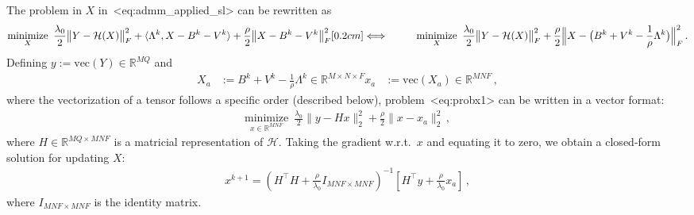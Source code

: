 \documentclass[a4paper,11pt]{article}
\def\\{}%
\def\eqref#1{<#1>}%
\newcommand{\mypar}[1]{\bigskip\noindent {\bf #1.}}
\begin{document}
\mypar{Updating $\bm{X}$}
The problem in $X$ in~\eqref{eq:admm_applied_sl} can be rewritten as
\begin{align}
  &
  \underset{X}{\text{minimize}}\,\,\,
  \frac{\lambda_0}{2}
  \big\|Y - \mathcal{H}(X)\big\|_F^2
  +
  \langle\Lambda^k, X - B^{k} - V^{k}\rangle
  +
  \frac{\rho}{2}
  \big\|X - B^k - V^k\big\|_{F}^2
  \notag
  \\[0.2cm]
  \Longleftrightarrow\qquad &
  \underset{X}{\text{minimize}}\,\,\,
  \frac{\lambda_0}{2}
  \big\|Y - \mathcal{H}(X) \big\|_F^2
  +
  \frac{\rho}{2}
  \Big\| X - \big(B^k + V^k - \frac{1}{\rho}\Lambda^k\big) \Big\|_F^2\,.
  \label{eq:probx1}
\end{align}
Defining $y := \text{vec}(Y) \in \mathbb{R}^{MQ}$ and
\begin{align*}
  X_a &:= B^k + V^k - \frac{1}{\rho}\Lambda^k \in \mathbb{R}^{M \times N \times F}
  \\
  x_a &:= \text{vec}(X_a) \in \mathbb{R}^{MNF}\,,
\end{align*}
where the vectorization of a tensor follows a specific order (described below),
problem~\eqref{eq:probx1} can be written in a vector format:
\begin{align*}
  \underset{x \in \mathbb{R}^{MNF}}{\text{minimize}}\,\,\,
  \frac{\lambda_0}{2}
  \|y - Hx\|_2^2
  +
  \frac{\rho}{2}
  \| x - x_a\|_2^2\,,
\end{align*}
where $H \in \mathbb{R}^{MQ \times MNF}$ is a matricial representation of
$\mathcal{H}$. Taking the gradient w.r.t.\ $x$ and equating it to zero, we
obtain a closed-form solution for updating $X$:
\begin{align}
  x^{k+1}
  =
  \left(H^\top H + \frac{\rho}{\lambda_0} I_{MNF \times MNF}\right)^{-1}
  \left[H^\top y + \frac{\rho}{\lambda_0} x_a\right]\,,
  \label{eq:probxclosedformvec}
\end{align}
where $I_{MNF \times MNF}$ is the identity matrix. 
\end{document}

